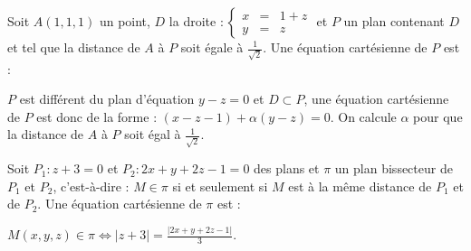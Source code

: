 \begin{question} 

Soit  $A(1,1,1)$ un point,  $D$ la droite  $ : \left\{\begin{array}{ccl}x&=&1+z\\y&=&z \end{array}\right.$ et $P$ un plan contenant $D$ et tel que la distance de $A$ à $P$ soit égale à   $\frac{1}{\sqrt 2}$. Une équation cartésienne de $P$ est :
\begin{answers}

     
 
    
   
   
\end{answers}
\begin{explanations}
$P$ est différent du plan d'équation  $y-z=0$ et $D \subset P$, une équation cartésienne de $P$ est donc de la forme : $(x-z-1)+ \alpha (y-z)=0$. On calcule $\alpha$ pour que la distance de $A$ à $P$ soit égal à $\frac{1}{\sqrt 2}$.
\end{explanations}

\end{question}


\begin{question} 

Soit  $P_1 : z+3=0$ et $P_2 : 2x+y+2z-1=0$ des plans et $\pi$  un plan bissecteur de $P_1$ et $P_2$, c'est-à-dire :   $M \in \pi$  si et seulement si $M$ est  à la même distance de $P_1$ et de  $P_2$. Une équation cartésienne de $\pi$ est : 
\begin{answers}

     
       
       
         
\end{answers}
\begin{explanations}
$M(x,y,z) \in \pi \Leftrightarrow |z+3|=\frac{|2x+y+2z-1|}{3}$.
\end{explanations}

\end{question}



